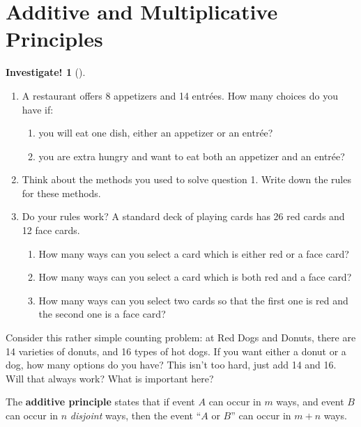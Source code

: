 \documentclass[10pt,]{book}
\newcommand{\terminology}[1]{\textbf{#1}}
\theoremstyle{plain}
\theoremstyle{definition}
\theoremstyle{definition}
\theoremstyle{definition}
\newtheorem{investigation}[project]{Investigate!}
\theoremstyle{definition}
\numberwithin{equation}{chapter}
\begin{document}
\section[{Additive and Multiplicative Principles}]{Additive and Multiplicative Principles}\label{sec_counting-addmult}
\begin{investigation}[]\label{investigation-10}
\hypertarget{p-670}{}%
%
\begin{enumerate}
\item\hypertarget{li-325}{}\hypertarget{p-671}{}%
A restaurant offers 8 appetizers and 14 entrées. How many choices do you have if: %
\begin{enumerate}
\item\hypertarget{li-326}{}you will eat one dish, either an appetizer or an entrée?%
\item\hypertarget{li-327}{}you are extra hungry and want to eat both an appetizer and an entrée?%
\end{enumerate}
%
\item\hypertarget{li-328}{}\hypertarget{p-672}{}%
Think about the methods you used to solve question 1. Write down the rules for these methods.%
\item\hypertarget{li-329}{}\hypertarget{p-673}{}%
Do your rules work? A standard deck of playing cards has 26 red cards and 12 face cards. %
\begin{enumerate}
\item\hypertarget{li-330}{}How many ways can you select a card which is either red or a face card?%
\item\hypertarget{li-331}{}How many ways can you select a card which is both red and a face card?%
\item\hypertarget{li-332}{}How many ways can you select two cards so that the first one is red and the second one is a face card?%
\end{enumerate}
%
\end{enumerate}
%
\end{investigation}
\hypertarget{p-674}{}%
Consider this rather simple counting problem: at Red Dogs and Donuts, there are 14 varieties of donuts, and 16 types of hot dogs. If you want either a donut or a dog, how many options do you have? This isn't too hard, just add 14 and 16. Will that always work? What is important here?%
\begin{assemblage}\label{assemblage-11}
\hypertarget{p-675}{}%
The \terminology{additive principle} states that if event \(A\) can occur in \(m\) ways, and event \(B\) can occur in \(n\) \emph{disjoint} ways, then the event ``\(A\) or \(B\)'' can occur in \(m + n\) ways.%
\end{assemblage}
\end{document}
